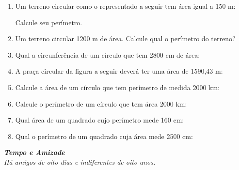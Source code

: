 \documentclass[twocolumn,oneside,a4paper,11pt]{article}
\begin{document}
\begin{enumerate}
\item Um terreno circular como o representado a seguir tem área igual a 150 m:


Calcule seu perímetro.

\item Um terreno circular 1200 m de área. Calcule qual o perímetro do terreno?

\item Qual a circunferência de um círculo que tem 2800 cm de área:

\item A praça circular da figura a seguir deverá ter uma área de 1590,43 m:

\item Calcule a área de um círculo que tem perímetro de medida 2000 km:

\item Calcule o perímetro de um círculo que tem área 2000 km:

\item Qual área de um quadrado cujo perímetro mede 160 cm:

\item Qual o perímetro de um quadrado cuja área mede 2500 cm:

\end{enumerate}

\begin{flushright}
\textit{\textbf{Tempo e Amizade}\\
Há amigos de oito dias e indiferentes de oito anos.}
\end{flushright}
\end{document}
